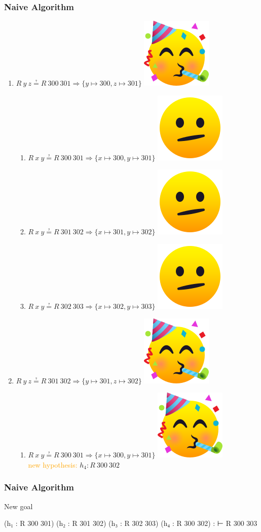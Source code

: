\documentclass[xetex]{beamer}
\newlength{\emojiheight}
\newcommand{\good}{\includegraphics[height=\emojiheight]{images/1f973}}
\newcommand{\bad}{\includegraphics[height=\emojiheight]{images/1fae4}}
\newcommand{\orange}[1]{\textcolor{orange}{#1}}
\begin{document}
\begin{frame}
  \frametitle{Naive Algorithm}

  \begin{enumerate}[<+->]
    \item $R~y~z ≟ R~300~301 ⇒ \{y ↦ 300, z ↦ 301\}$ \good
          \begin{enumerate}[<+->]
            \item $R~x~y ≟ R~300~301 ⇒ \{x ↦ 300, y ↦ 301\}$ \bad
            \item $R~x~y ≟ R~301~302 ⇒ \{x ↦ 301, y ↦ 302\}$ \bad
            \item $R~x~y ≟ R~302~303 ⇒ \{x ↦ 302, y ↦ 303\}$ \bad
          \end{enumerate}
    \item $R~y~z ≟ R~301~302 ⇒ \{y ↦ 301, z ↦ 302\}$ \good
          \begin{enumerate}[<+->]
            \item $R~x~y ≟ R~300~301 ⇒ \{x ↦ 300, y ↦ 301\}$ \good \\
                  \orange{new hypothesis:} $h_{4} : R~300~302$
          \end{enumerate}
  \end{enumerate}
\end{frame}

\begin{frame}[fragile]
  \frametitle{Naive Algorithm}

  \begin{block}{New goal}
    \begin{leancode}
        (h₁ : R 300 301)
        (h₂ : R 301 302)
        (h₃ : R 302 303)
        (h₄ : R 300 302) :
        ⊢ R 300 303
    \end{leancode}
  \end{block}
\end{frame}
\end{document}
